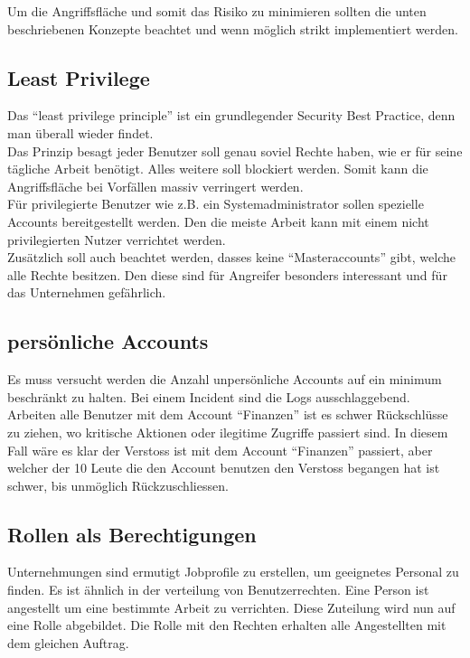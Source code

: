 Um die Angriffsfläche und somit das Risiko zu minimieren sollten die unten beschriebenen Konzepte beachtet und wenn möglich strikt implementiert werden.

\subsection{Least Privilege}
Das ``least privilege principle'' ist ein grundlegender Security Best Practice, denn man überall wieder findet.\\

Das Prinzip besagt jeder Benutzer soll genau soviel Rechte haben, wie er für seine tägliche Arbeit benötigt. Alles weitere soll blockiert werden.
Somit kann die Angriffsfläche bei Vorfällen massiv verringert werden.\\

Für privilegierte Benutzer wie z.B. ein Systemadministrator sollen spezielle Accounts bereitgestellt werden.
Den die meiste Arbeit kann mit einem nicht privilegierten Nutzer verrichtet werden.\\

Zusätzlich soll auch beachtet werden, dasses keine ``Masteraccounts'' gibt, welche alle Rechte besitzen.
Den diese sind für Angreifer besonders interessant und für das Unternehmen gefährlich.


\subsection{persönliche Accounts}
Es muss versucht werden die Anzahl unpersönliche Accounts auf ein minimum beschränkt zu halten.
Bei einem Incident sind die Logs ausschlaggebend.\\

Arbeiten alle Benutzer mit dem Account ``Finanzen'' ist es schwer Rückschlüsse zu ziehen, wo kritische Aktionen oder ilegitime Zugriffe passiert sind.
In diesem Fall wäre es klar der Verstoss ist mit dem Account ``Finanzen'' passiert, aber welcher der 10 Leute die den Account benutzen den Verstoss begangen hat ist schwer, bis unmöglich Rückzuschliessen.

\subsection{Rollen als Berechtigungen}
Unternehmungen sind ermutigt Jobprofile zu erstellen, um geeignetes Personal zu finden.
Es ist ähnlich in der verteilung von Benutzerrechten.
Eine Person ist angestellt um eine bestimmte Arbeit zu verrichten.
Diese Zuteilung wird nun auf eine Rolle abgebildet.
Die Rolle mit den Rechten erhalten alle Angestellten mit dem gleichen Auftrag.\\

